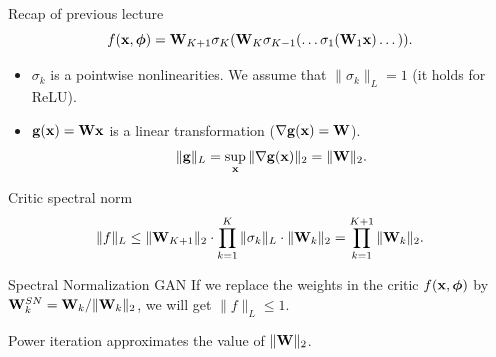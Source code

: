 \begin{frame}{Recap of previous lecture}
	\vspace{-0.3cm}
	\[
		f(\mathbf{x}, \boldsymbol{\phi}) = \mathbf{W}_{K+1} \sigma_K (\mathbf{W}_K \sigma_{K-1}(\dots \sigma_1(\mathbf{W}_1 \mathbf{x}) \dots)).
	\]
	\vspace{-0.3cm}
	\begin{itemize}
		\item $\sigma_k$ is a pointwise nonlinearities. We assume that $\| \sigma_k \|_L = 1$ (it holds for ReLU).
		\item $\mathbf{g}(\mathbf{x}) = \mathbf{W} \mathbf{x}$ is a linear transformation ($\nabla \mathbf{g}(\mathbf{x}) = \mathbf{W}$).
		\[
			\| \mathbf{g} \|_L = \sup_{\mathbf{x}} \| \nabla \mathbf{g}(\mathbf{x}) \|_2 = \|\mathbf{W}\|_2.
		\]
	\end{itemize}
	\vspace{-0.5cm}
	\begin{block}{Critic spectral norm}
		\vspace{-0.5cm}
		\[
			\| f \|_L \leq \| \mathbf{W}_{K+1}\|_2 \cdot \prod_{k=1}^K  \| \sigma_k \|_L \cdot \| \mathbf{W}_k \|_2 = \prod_{k=1}^{K+1} \|\mathbf{W}_k\|_2.
		\]
		\vspace{-0.5cm}
	\end{block}
	\begin{block}{Spectral Normalization GAN}
	If we replace the weights in the critic $f(\mathbf{x}, \boldsymbol{\phi})$ by $\mathbf{W}^{SN}_k = \mathbf{W}_k / \|\mathbf{W}_k\|_2$, we will get $\| f\|_L \leq 1.$ \\
	\end{block}
	 Power iteration approximates the value of $\|\mathbf{W}\|_2$.
\end{frame}

